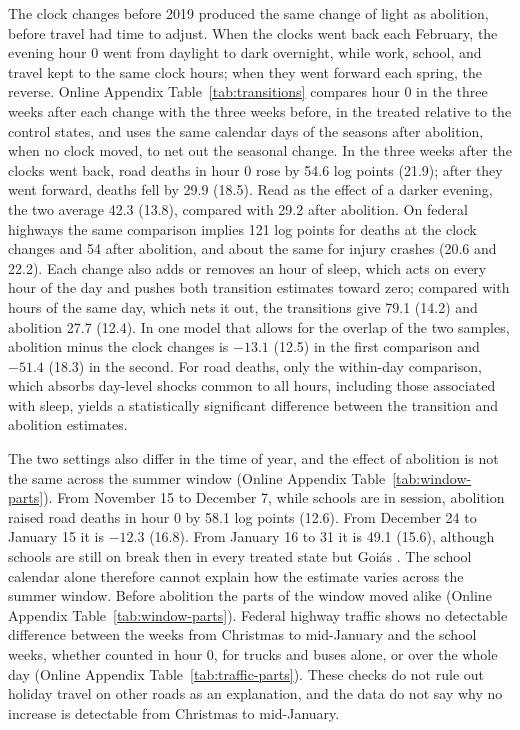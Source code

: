The clock changes before 2019 produced the same change of light as abolition, before travel had time to adjust. When the clocks went back each February, the evening hour 0 went from daylight to dark overnight, while work, school, and travel kept to the same clock hours; when they went forward each spring, the reverse. Online Appendix Table~\ref{tab:transitions} compares hour 0 in the three weeks after each change with the three weeks before, in the treated relative to the control states, and uses the same calendar days of the seasons after abolition, when no clock moved, to net out the seasonal change. In the three weeks after the clocks went back, road deaths in hour 0 rose by 54.6 log points (21.9); after they went forward, deaths fell by 29.9 (18.5). Read as the effect of a darker evening, the two average 42.3 (13.8), compared with 29.2 after abolition. On federal highways the same comparison implies 121 log points for deaths at the clock changes and 54 after abolition, and about the same for injury crashes (20.6 and 22.2). Each change also adds or removes an hour of sleep, which acts on every hour of the day and pushes both transition estimates toward zero; compared with hours of the same day, which nets it out, the transitions give 79.1 (14.2) and abolition 27.7 (12.4). In one model that allows for the overlap of the two samples, abolition minus the clock changes is $-13.1$ (12.5) in the first comparison and $-51.4$ (18.3) in the second. For road deaths, only the within-day comparison, which absorbs day-level shocks common to all hours, including those associated with sleep, yields a statistically significant difference between the transition and abolition estimates.

The two settings also differ in the time of year, and the effect of abolition is not the same across the summer window (Online Appendix Table~\ref{tab:window-parts}). From November 15 to December 7, while schools are in session, abolition raised road deaths in hour 0 by 58.1 log points (12.6). From December 24 to January 15 it is $-12.3$ (16.8). From January 16 to 31 it is 49.1 (15.6), although schools are still on break then in every treated state but Goi\'as \citep{saopaulo2018resolucao, goias2018parecer, minas2023ano}. The school calendar alone therefore cannot explain how the estimate varies across the summer window. Before abolition the parts of the window moved alike (Online Appendix Table~\ref{tab:window-parts}). Federal highway traffic shows no detectable difference between the weeks from Christmas to mid-January and the school weeks, whether counted in hour 0, for trucks and buses alone, or over the whole day (Online Appendix Table~\ref{tab:traffic-parts}). These checks do not rule out holiday travel on other roads as an explanation, and the data do not say why no increase is detectable from Christmas to mid-January.

